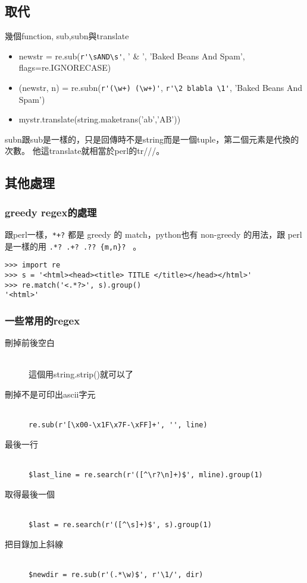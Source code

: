 \subsection{取代}
幾個function, sub,subn與translate
\begin{itemize}
  \item newstr = re.sub(\verb=r'\sAND\s'=, ' \& ', 'Baked Beans And Spam', flags=re.IGNORECASE)
  \item (newstr, n) = re.subn(\verb=r'(\w+) (\w+)'=, \verb=r'\2 blabla \1'=, 'Baked Beans And Spam')
  \item mystr.translate(string.maketrans('ab','AB'))
\end{itemize}
subn跟sub是一樣的，只是回傳時不是string而是一個tuple，第二個元素是代換的次數。
他這translate就相當於perl的tr///。

\subsection{其他處理}
\subsubsection{greedy regex的處理}
跟perl一樣，\verb=*+?= 都是 greedy 的 match，python也有 non-greedy 的用法，跟 perl
是一樣的用 \verb=.*? .+? .?? {m,n}? = 。
\begin{verbatim}
>>> import re
>>> s = '<html><head><title> TITLE </title></head></html>'
>>> re.match('<.*?>', s).group()
'<html>'
\end{verbatim}

\subsubsection{一些常用的regex}
\begin{description}
  \item [刪掉前後空白] \hfill \\
    這個用string.strip()就可以了
  \item [刪掉不是可印出ascii字元] \hfill \\
    \verb=re.sub(r'[\x00-\x1F\x7F-\xFF]+', '', line)=
  \item [最後一行] \hfill \\
    \verb|$last_line = re.search(r'([^\r?\n]+)$', mline).group(1)|
  \item [取得最後一個] \hfill \\
    \verb|$last = re.search(r'([^\s]+)$', s).group(1)|
  \item [把目錄加上斜線] \hfill \\
    \verb|$newdir = re.sub(r'(.*\w)$', r'\1/', dir)|
\end{description}

